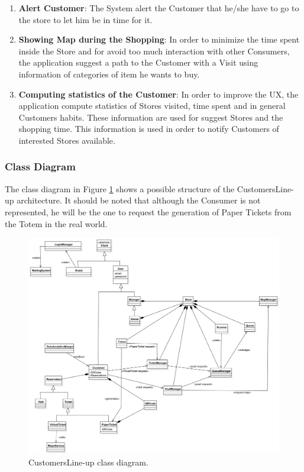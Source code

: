 \documentclass[a4paper, 12pt, oneside]{article}
\newcommand{\yasmin}[1]{\textcolor{Red}{#1}}
\newcommand{\giovanni}[1]{\textcolor{Blue}{#1}}
\begin{document}
\begin{enumerate}
\item \textbf{Alert Customer}: The System alert the Customer that he/she have to go to the store to let him be in time for it.

\item \textbf{Showing Map during the Shopping}: In order to minimize the time spent inside the Store and for avoid too much interaction with other Consumers, the application suggest a path to the Customer with a Visit using information of categories of item he wants to buy.

\item \textbf{Computing statistics of the Customer}: In order to improve the UX, the application compute statistics of Stores visited, time spent and in general Customers habits. These information are used for suggest Stores and the shopping time. This information is used in order to notify Customers of interested Stores available. %
\end{enumerate}
\subsubsection{Class Diagram}
The class diagram in Figure \ref{class_diagram} shows a possible structure of the CustomersLine-up architecture. It should be noted that although the Consumer is not represented, he will be the one to request the generation of Paper Tickets from the Totem in the real world.
\begin{figure}[h!]
\centering
	\centering
  	\includegraphics[height=0.55\textheight, scale=0.2, keepaspectratio]{img/class_diagram.jpg}
	\caption{CustomersLine-up class diagram.}
 	\label{class_diagram}
\end{figure}
\end{document}

